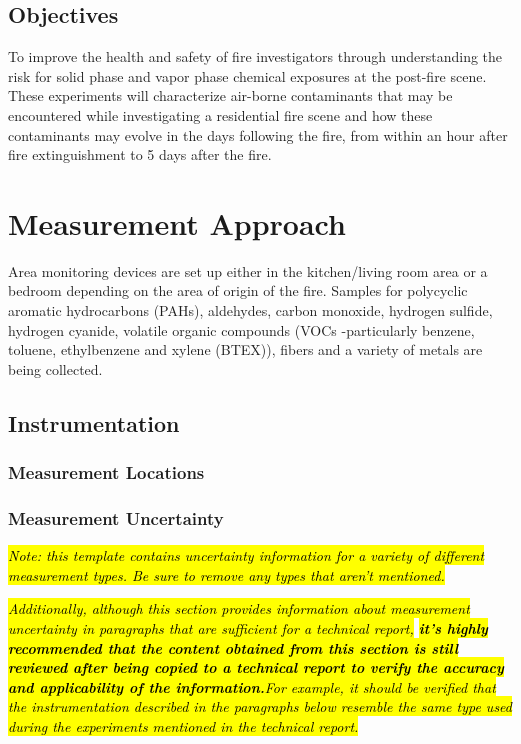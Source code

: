 \documentclass[12pt,oneside]{book}
\begin{document}
\section{Objectives}

To improve the health and safety of fire investigators through understanding the risk for solid phase and vapor phase chemical exposures at the post-fire scene.  These experiments will characterize air-borne contaminants that may be encountered while investigating a residential fire scene and how these contaminants may evolve in the days following the fire, from within an hour after fire extinguishment to 5 days after the fire.          


\chapter{Measurement Approach}

Area monitoring devices are set up either in the kitchen/living room area or a bedroom depending on the area of origin of the fire.  Samples for polycyclic aromatic hydrocarbons (PAHs), aldehydes, carbon monoxide, hydrogen sulfide, hydrogen cyanide, volatile organic compounds (VOCs -particularly benzene, toluene, ethylbenzene and xylene (BTEX)), fibers and a variety of metals are being collected.  

\section{Instrumentation}
\label{sec:instrument}

\subsection{Measurement Locations}
\label{subsec:measure_locs}

\subsection{Measurement Uncertainty}
\label{subsec:uncertainty}

\textit{\hl{Note: this template contains uncertainty information for a variety of different measurement types. Be sure to remove any types that aren't mentioned.}} 

\textit{\hl{Additionally, although this section provides information about measurement uncertainty in paragraphs that are sufficient for a technical report,}\textbf{\hl{ it's highly recommended that the content obtained from this section is still reviewed after being copied to a technical report to verify the accuracy and applicability of the information.}}\hl{For example, it should be verified that the instrumentation described in the paragraphs below resemble the same type used during the experiments mentioned in the technical report.}}
\end{document}
